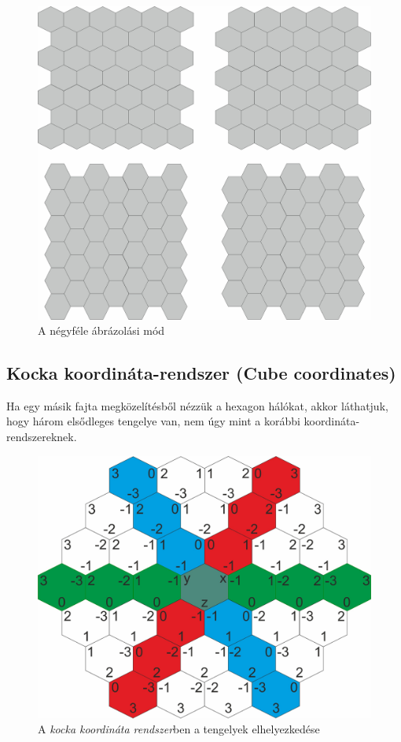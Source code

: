\begin{figure}[h!]
\centering
\includegraphics[scale=0.2]{kepek/OffsetFour.jpg}
\caption{A négyféle ábrázolási mód}
\label{fig:OffsetFour}
\end{figure}

\subsection{Kocka koordináta-rendszer (Cube coordinates)}

Ha egy másik fajta megközelítésből nézzük a hexagon hálókat, akkor láthatjuk, hogy három elsődleges tengelye van, nem úgy mint a korábbi koordináta-rendszereknek. 

\begin{figure}[h!]
\centering
\includegraphics[scale=0.2]{kepek/CubeCoord.jpg}
\caption{A \textit{kocka koordináta rendszer}ben a tengelyek elhelyezkedése}
\label{fig:CubeCoord}
\end{figure}


